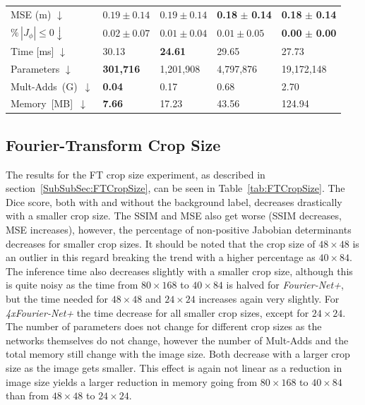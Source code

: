 \begin{table}[h]
\begin{tabularx}{\textwidth}{Y Y Y Y Y}
		MSE (m) $\downarrow$ & $0.19 \pm 0.14$ & $0.19 \pm 0.14$ & \textbf{0.18} $\pm$ \textbf{0.14} & \textbf{0.18} $\pm$ \textbf{0.14} \\
		$\% \, |J_{\phi}|\leq0 \downarrow$ & $0.02 \pm 0.07$ & $0.01 \pm 0.04$ & $0.01 \pm 0.05$ & \textbf{0.00} $\pm$ \textbf{0.00} \\
		Time [ms] $\downarrow$ 	  & 30.13 	& \textbf{24.61} 	& 29.65 	& 27.73 \\
		Parameters $\downarrow$ 	  & \textbf{301,716} 	& 1,201,908 	& 4,797,876 	& 19,172,148 \\
		\mbox{Mult-Adds (G) $\downarrow$} & \textbf{0.04} 	& 0.17 		& 0.68 		& 2.70 \\
		\mbox{Memory [MB]  $\downarrow$}	  & \textbf{7.66} 	& 17.23 		& 43.56 		& 124.94 \\
		\bottomrule
	\end{tabularx}
\end{table}


\subsection{Fourier-Transform Crop Size} \label{SubSec:ResultsFTCropSize}
The results for the FT crop size experiment, as described in section~\ref{SubSubSec:FTCropSize}, can be seen in Table~\ref{tab:FTCropSize}. The Dice score, both with and without the background label, decreases drastically with a smaller crop size. The SSIM and MSE also get worse (SSIM decreases, MSE increases), however, the percentage of non-positive Jabobian determinants decreases for smaller crop sizes. It should be noted that the crop size of $48 \times 48$ is an outlier in this regard breaking the trend with a higher percentage as $40 \times 84$. The inference time also decreases slightly with a smaller crop size, although this is quite noisy as the time from $80 \times 168$ to $40 \times 84$ is halved for \emph{Fourier-Net+}, but the time needed for $48 \times 48$ and $24 \times 24$ increases again very slightly. For \emph{4xFourier-Net+} the time decrease for all smaller crop sizes, except for $24 \times 24$. The number of parameters does not change for different crop sizes as the networks themselves do not change, however the number of Mult-Adds and the total memory still change with the image size. Both decrease with a larger crop size as the image gets smaller. This effect is again not linear as a reduction in image size yields a larger reduction in memory going from $80 \times 168$ to $40 \times 84$ than from $48 \times 48$ to $24 \times 24$. 

